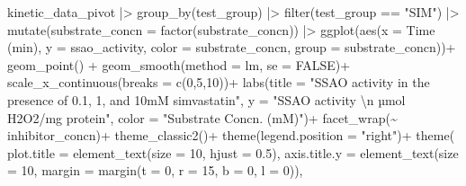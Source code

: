 \documentclass[
  letterpaper,
  DIV=11,
  numbers=noendperiod]{scrreprt}
\newenvironment{Shaded}{\begin{snugshade}}{\end{snugshade}}
\newcommand{\AttributeTok}[1]{\textcolor[rgb]{0.40,0.45,0.13}{#1}}
\newcommand{\ConstantTok}[1]{\textcolor[rgb]{0.56,0.35,0.01}{#1}}
\newcommand{\DecValTok}[1]{\textcolor[rgb]{0.68,0.00,0.00}{#1}}
\newcommand{\FloatTok}[1]{\textcolor[rgb]{0.68,0.00,0.00}{#1}}
\newcommand{\FunctionTok}[1]{\textcolor[rgb]{0.28,0.35,0.67}{#1}}
\newcommand{\NormalTok}[1]{\textcolor[rgb]{0.00,0.23,0.31}{#1}}
\newcommand{\SpecialCharTok}[1]{\textcolor[rgb]{0.37,0.37,0.37}{#1}}
\newcommand{\StringTok}[1]{\textcolor[rgb]{0.13,0.47,0.30}{#1}}
\begin{document}
\begin{Shaded}
\begin{Highlighting}[]
\NormalTok{kinetic\_data\_pivot }\SpecialCharTok{|\textgreater{}} 
  \FunctionTok{group\_by}\NormalTok{(test\_group) }\SpecialCharTok{|\textgreater{}} 
  \FunctionTok{filter}\NormalTok{(test\_group }\SpecialCharTok{==} \StringTok{"SIM"}\NormalTok{) }\SpecialCharTok{|\textgreater{}} 
  \FunctionTok{mutate}\NormalTok{(}\AttributeTok{substrate\_concn =} \FunctionTok{factor}\NormalTok{(substrate\_concn)) }\SpecialCharTok{|\textgreater{}} 
  \FunctionTok{ggplot}\NormalTok{(}\FunctionTok{aes}\NormalTok{(}\AttributeTok{x =} \StringTok{\textasciigrave{}}\AttributeTok{Time (min)}\StringTok{\textasciigrave{}}\NormalTok{, }
             \AttributeTok{y =}\NormalTok{ ssao\_activity, }
             \AttributeTok{color =}\NormalTok{ substrate\_concn, }
             \AttributeTok{group =}\NormalTok{ substrate\_concn))}\SpecialCharTok{+} 
  \FunctionTok{geom\_point}\NormalTok{() }\SpecialCharTok{+} 
  \FunctionTok{geom\_smooth}\NormalTok{(}\AttributeTok{method =}\NormalTok{ lm, }\AttributeTok{se =} \ConstantTok{FALSE}\NormalTok{)}\SpecialCharTok{+} 
  \FunctionTok{scale\_x\_continuous}\NormalTok{(}\AttributeTok{breaks =} \FunctionTok{c}\NormalTok{(}\DecValTok{0}\NormalTok{,}\DecValTok{5}\NormalTok{,}\DecValTok{10}\NormalTok{))}\SpecialCharTok{+}
  \FunctionTok{labs}\NormalTok{(}\AttributeTok{title =} \StringTok{"SSAO activity in the presence of 0.1, 1, and 10mM simvastatin"}\NormalTok{,}
       \AttributeTok{y =} \StringTok{"SSAO activity }\SpecialCharTok{\textbackslash{}n}\StringTok{ µmol H2O2/mg protein"}\NormalTok{,}
       \AttributeTok{color =} \StringTok{"Substrate Concn. (mM)"}\NormalTok{)}\SpecialCharTok{+}
  \FunctionTok{facet\_wrap}\NormalTok{(}\SpecialCharTok{\textasciitilde{}}\NormalTok{ inhibitor\_concn)}\SpecialCharTok{+}
  \FunctionTok{theme\_classic2}\NormalTok{()}\SpecialCharTok{+}
  \FunctionTok{theme}\NormalTok{(}\AttributeTok{legend.position =} \StringTok{"right"}\NormalTok{)}\SpecialCharTok{+}
  \FunctionTok{theme}\NormalTok{(}
    \AttributeTok{plot.title =} \FunctionTok{element\_text}\NormalTok{(}\AttributeTok{size =} \DecValTok{10}\NormalTok{, }\AttributeTok{hjust =} \FloatTok{0.5}\NormalTok{),}
    \AttributeTok{axis.title.y =} \FunctionTok{element\_text}\NormalTok{(}\AttributeTok{size =} \DecValTok{10}\NormalTok{, }\AttributeTok{margin =} \FunctionTok{margin}\NormalTok{(}\AttributeTok{t =} \DecValTok{0}\NormalTok{, }\AttributeTok{r =} \DecValTok{15}\NormalTok{, }\AttributeTok{b =} \DecValTok{0}\NormalTok{, }\AttributeTok{l =} \DecValTok{0}\NormalTok{)),}

\end{Highlighting}
\end{Shaded}
\end{document}
